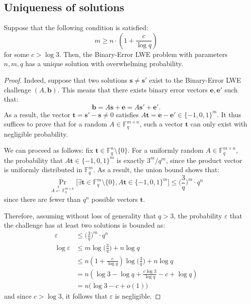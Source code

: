 \documentclass[a4paper]{article}
\theoremstyle{definition}
\theoremstyle{remark}
\renewcommand{\epsilon}{\varepsilon}
\renewcommand{\vec}{\mathbf}
\newcommand{\F}{\mathbb{F}}
\begin{document}
\subsection{Uniqueness of solutions}
\begin{theorem}
\label{thm:uniqueness}
Suppose that the following condition is satisfied:
\[ m \geq n\cdot\left(1 + \frac{c}{\log q}\right) \]
for some $c > \log 3$. Then, the Binary-Error LWE problem with parameters
$n,m,q$ has a unique solution with overwhelming probability.
\end{theorem}
\begin{proof}
Indeed, suppose that two solutions $\vec s\neq\vec s'$ exist to the
Binary-Error LWE challenge $(A,\vec b)$. This means that there exists
binary error vectors $\vec e,\vec e'$ such that:
\[ \vec b = A\vec s + \vec e = A\vec s' + \vec e'. \]
As a result, the vector $\vec t = \vec s'-\vec s \neq 0$ satisfies $A\vec t =
\vec e - \vec e' \in \{-1,0,1\}^m$. It thus suffices to prove that for a
random $A\in\F_q^{m\times n}$, such a vector $\vec t$ can only exist with
negligible probability.

We can proceed as follows: fix $\vec t\in\F_q^n\setminus\{0\}$. For
a uniformly random $A\in\F_q^{m\times n}$, the probability that $A\vec
t\in\{-1,0,1\}^m$ is exactly $3^m/q^m$, since the product vector is
uniformly distributed in $\F_q^m$. As a result, the union bound shows
that:
\[ \Pr_{A\overset{\$}{\gets}\F_q^{m\times n}}
   \big[ \exists\vec t\in\F_q^m\setminus\{0\}, A\vec t\in\{-1,0,1\}^m
\big] \leq \Big(\frac{3}{q}\Big)^m \cdot q^n \]
since there are fewer than $q^n$ possible vectors $\vec t$.

Therefore, assuming without loss of generality that $q>3$, the
probability $\epsilon$ that the challenge has at least two solutions is
bounded as:
\begin{align*}
     \epsilon &\leq \Big(\frac{3}{q}\Big)^m \cdot q^n \\
\log \epsilon &\leq m\log\Big(\frac3q\Big) + n\log q  \\
              &\leq n\left(1 + \frac{c}{\log
q}\right)\log\Big(\frac3q\Big) + n\log q  \\
              &= n\left(\log 3 - \log q + \frac{c\log 3}{\log q} - c +
\log q\right) \\
              &= n\big(\log 3 - c + o(1)\big)
\end{align*}
and since $c > \log 3$, it follows that $\epsilon$ is negligible.
\end{proof}
\end{document}
